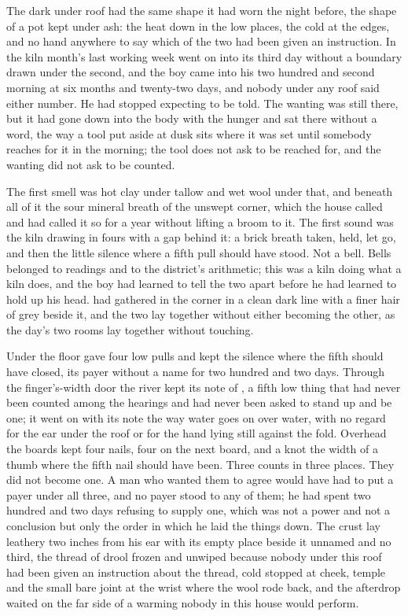 
The dark under  roof had the same shape it had worn the night before, the shape of a pot kept under ash: the heat down in the low places, the cold at the edges, and no hand anywhere to say which of the two had been given an instruction. In  the kiln month's last working week went on into its third day without a boundary drawn under the second, and the boy came into his two hundred and second morning at six months and twenty-two days, and nobody under any roof said either number. He had stopped expecting to be told. The wanting was still there, but it had gone down into the body with the hunger and sat there without a word, the way a tool put aside at dusk sits where it was set until somebody reaches for it in the morning; the tool does not ask to be reached for, and the wanting did not ask to be counted.

The first smell was hot clay under tallow and wet wool under that, and beneath all of it the sour mineral breath of the unswept corner, which the house called  and had called it so for a year without lifting a broom to it. The first sound was the kiln drawing in fours with a gap behind it: a brick breath taken, held, let go, and then the little silence where a fifth pull should have stood. Not a bell. Bells belonged to readings and to the district's arithmetic; this was a kiln doing what a kiln does, and the boy had learned to tell the two apart before he had learned to hold up his head.  had gathered in the corner in a clean dark line with a finer hair of grey beside it, and the two lay together without either becoming the other, as the day's two rooms lay together without touching.

Under the floor  gave four low pulls and kept the silence where the fifth should have closed, its payer without a name for two hundred and two days. Through the finger's-width door the river kept its note of , a fifth low thing that had never been counted among the hearings and had never been asked to stand up and be one; it went on with its note the way water goes on over water, with no regard for the ear under the roof or for the hand lying still against the fold. Overhead the boards kept four nails, four on the next board, and a knot the width of a thumb where the fifth nail should have been. Three counts in three places. They did not become one. A man who wanted them to agree would have had to put a payer under all three, and no payer stood to any of them; he had spent two hundred and two days refusing to supply one, which was not a power and not a conclusion but only the order in which he laid the things down. The crust lay leathery two inches from his ear with its empty place beside it unnamed and no third, the thread of drool frozen and unwiped because nobody under this roof had been given an instruction about the thread, cold stopped at cheek, temple and the small bare joint at the wrist where the wool rode back, and the afterdrop waited on the far side of a warming nobody in this house would perform.

